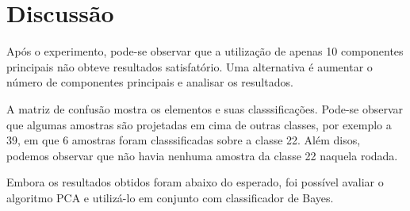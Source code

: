 \documentclass[12pt]{article}
\begin{document}
\section{Discussão}

  \par Após o experimento, pode-se observar que a utilização de apenas 10 componentes principais não obteve resultados satisfatório. Uma alternativa é aumentar o número de componentes principais e analisar os resultados. 
  
  \par A matriz de confusão mostra os elementos e suas classsificações. Pode-se observar que algumas amostras são projetadas em cima de outras classes, por exemplo a 39, em que 6 amostras foram classsificadas sobre a classe 22. Além disos, podemos observar que não havia nenhuma amostra da classe 22 naquela rodada. 
  
  \par Embora os resultados obtidos foram abaixo do esperado, foi possível avaliar o algoritmo PCA e utilizá-lo em conjunto com classificador de Bayes. 


\end{document}
